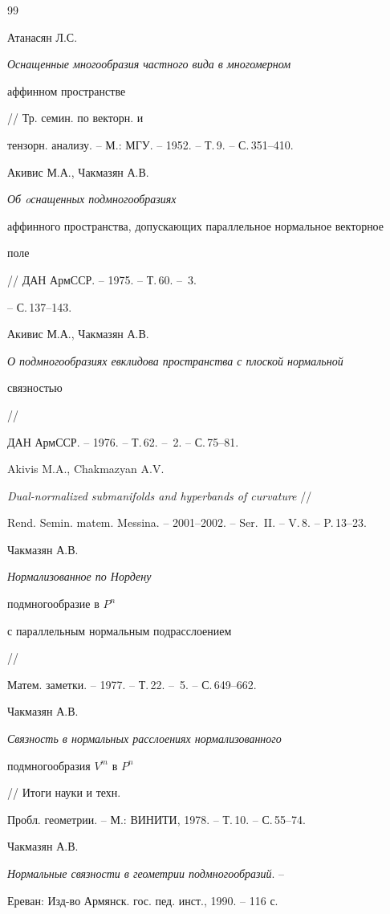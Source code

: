\begin{thebibliography}{99}


Атанасян Л.С.


{\it Оснащенные многообразия частного вида в многомерном


аффинном пространстве} // Тр. семин. по векторн. и


тензорн. анализу. -- М.: МГУ. -- 1952. -- Т.\,9. -- С.\,351--410.







Акивис М.А., Чакмазян А.В.


{\it Об oснащенных подмногообразиях


аффинного пространства, допускающих параллельное нормальное векторное


поле} // ДАН АрмССР. -- 1975. -- Т.\,60. -- \No\,3.


-- С.\,137--143.





Акивис М.А., Чакмазян А.В.


{\it О подмногообразиях евклидова пространства с плоской нормальной


связностью} //


ДАН АрмССР. -- 1976. -- Т.\,62. -- \No\,2. -- С.\,75--81.





Akivis M.A., Chakmazyan A.V.


{\it Dual-normalized submanifolds and hyperbands of curvature} //


Rend. Semin. matem. Messina. -- 2001--2002. -- Ser.~II. -- V.\,8. -- P.\,13--23.







Чакмазян А.В.


{\it Нормализованное по Нордену


подмногообразие в $P^n$


с параллельным нормальным подрасслоением} //


Матем. заметки. -- 1977. -- Т.\,22. -- \No\,5. -- С.\,649--662.





Чакмазян А.В.


{\it Связность в нормальных расслоениях нормализованного


подмногообразия $V^m$ в $P^n$} // Итоги науки и техн.


Пробл. геометрии. -- М.: ВИНИТИ, 1978. -- Т.\,10. -- С.\,55--74.







Чакмазян А.В.


{\it Нормальные связности в геометрии подмногообразий}. --


Ереван: Изд-во Армянск. гос. пед. инст., 1990. -- 116 с.





\end{thebibliography}
